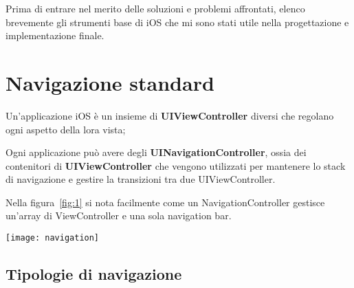 

Prima di entrare nel merito delle soluzioni e problemi affrontati, elenco brevemente gli strumenti
base di iOS che mi sono stati utile nella progettazione e implementazione finale.

\section{Navigazione standard}

Un'applicazione iOS è un insieme di \textbf{UIViewController}\cite{viewcontroller} diversi che 
regolano ogni aspetto della lora vista;


Ogni applicazione può avere degli \textbf{UINavigationController}\cite{navigationcontroller},
ossia dei contenitori di \textbf{UIViewController} che vengono
utilizzati per mantenere lo stack di navigazione e gestire la transizioni tra due UIViewController.

Nella figura~\ref{fig:1} si nota facilmente come un NavigationController gestisce un'array di ViewController e una sola 
navigation bar. \\

\begin{minipage}{\linewidth}
    \centering
    \texttt{[image: navigation]}
    \label{fig:1}
\end{minipage}

\subsection{Tipologie di navigazione}\label{sec:navigation}

